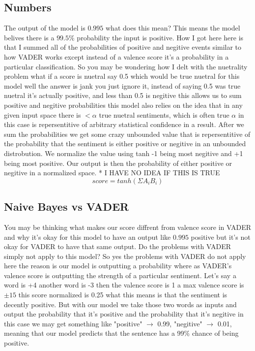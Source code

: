 \documentclass[12pt]{article}
\begin{document}
\subsection{Numbers}
The output of the model is $0.995$ what does this mean? This means the model belives there is a $99.5\%$ probability the input is positive. How I got here here is that I summed all of the probabilities of positive and negitive events similar to how VADER works except instead of a valence score it's a probability in a particular classification. So you may be wondering how I delt with the nuetrality problem what if a score is nuetral say 0.5 which would be true nuetral for this model well the answer is jank you just ignore it, instead of saying 0.5 was true nuetral it's actually positive, and less than 0.5 is negitive this allows us to sum positive and negitive probabilities this model also relies on the idea that in any given input space there is $<\alpha$ true nuetral sentiments, which is often true $\alpha$ in this case is repersentitive of arbitrary statistical confidence in a result. After we sum the probabilities we get some crazy unbounded value that is repersentitive of the probability that the sentiment is either positive or negitive in an unbounded distrobution. We normalize the value using tanh -1 being most negitive and +1 being most positive. Our output is then the probability of either positive or negitive in a normalized space. * I HAVE NO IDEA IF THIS IS TRUE
$$
score = tanh(\Sigma{}A_i B_i)
$$

\subsection{Naive Bayes vs VADER}
You may be thinking what makes our score diffrent from valence score in VADER and why it's okay for this model to have an output like $0.995$ positive but it's not okay for VADER to have that same output. Do the problems with VADER simply not apply to this model? So yes the problems with VADER do not apply here the reason is our model is outputting a probability where as VADER's valence score is outputting the strength of a particular sentiment. Let's say a word is +4 another word is -3 then the valence score is 1 a max valence score is $\pm15$ this score normalized is 0.25 what this means is that the sentiment  is decently positive. But with our model we take those two words as inputs and output the probability that it's positive and the probability that it's negitive in this case we may get something like "positive" $\rightarrow$ 0.99, "negitive" $\rightarrow$ 0.01, meaning that our model predicts that the sentence has a 99\% chance of being positive.
\end{document}
